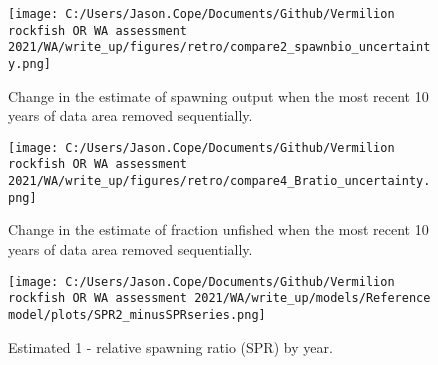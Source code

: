\documentclass[11pt,
  english,
  a4paper,
]{article}
\begin{document}
\begin{figure}
\centering
\texttt{[image: C:/Users/Jason.Cope/Documents/Github/Vermilion rockfish OR WA assessment 2021/WA/write\_up/figures/retro/compare2\_spawnbio\_uncertainty.png]}
\caption{Change in the estimate of spawning output when the most recent 10 years of data area removed sequentially.\label{fig:retro-ssb}}
\end{figure}

\tagmcend\tagstructend


\begin{figure}
\centering
\texttt{[image: C:/Users/Jason.Cope/Documents/Github/Vermilion rockfish OR WA assessment 2021/WA/write\_up/figures/retro/compare4\_Bratio\_uncertainty.png]}
\caption{Change in the estimate of fraction unfished when the most recent 10 years of data area removed sequentially.\label{fig:retro-depl}}
\end{figure}

\tagmcend\tagstructend

\newpage


\begin{figure}
\centering
\texttt{[image: C:/Users/Jason.Cope/Documents/Github/Vermilion rockfish OR WA assessment 2021/WA/write\_up/models/Reference model/plots/SPR2\_minusSPRseries.png]}
\caption{Estimated 1 - relative spawning ratio (SPR) by year.\label{fig:1-spr}}
\end{figure}

\tagmcend\tagstructend

\clearpage

\end{document}
